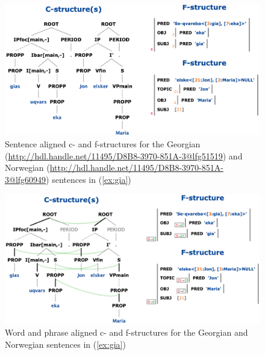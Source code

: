 \documentclass[output=paper,hidelinks]{langscibook}
\begin{document}
\eal \label{ex:gia}
\zl

\begin{figure}
    \includegraphics[width=\textwidth]{figures/Treebanks/unaligned}
    \caption{Sentence aligned c- and f-structures for the Georgian (\url{http://hdl.handle.net/11495/D8B8-3970-851A-3@lfg51519}) and Norwegian (\url{http://hdl.handle.net/11495/D8B8-3970-851A-3@lfg60949}) sentences in (\ref{ex:gia})}
    \label{fig:love-1}
\end{figure}

\begin{figure}
    \includegraphics[width=\textwidth]{figures/Treebanks/aligned}
    \caption{Word and phrase aligned c- and f-structures for the Georgian and Norwegian sentences in (\ref{ex:gia})}
    \label{fig:love-2}
\end{figure}
\end{document}
